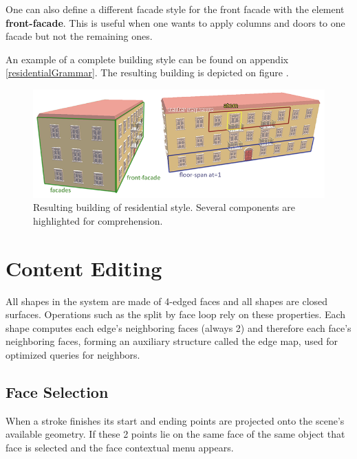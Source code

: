 One can also define a different facade style for the front facade with the element \textbf{front-facade}.
This is useful when one wants to apply columns and doors to one facade but not the remaining ones.


An example of a complete building style can be found on appendix \ref{residentialGrammar}. The resulting building is depicted on
figure .

\begin{figure}[ht]
	\centering
		\includegraphics[width=\textwidth]{gfx/style.png}
	\caption{Resulting building of residential style. Several components are highlighted for comprehension.}
	\label{fig:style}
\end{figure}




\section{Content Editing}

All shapes in the system are made of 4-edged faces and all shapes are closed surfaces.
Operations such as the split by face loop rely on these properties.
Each shape computes each edge's neighboring faces (always 2)
and therefore each face's neighboring faces, forming an auxiliary structure called the edge map,
used for optimized queries for neighbors.


\subsection{Face Selection}

When a stroke finishes its start and ending points are projected onto the scene's available geometry.
If these 2 points lie on the same face of the same object that face is selected and the face contextual menu appears.

